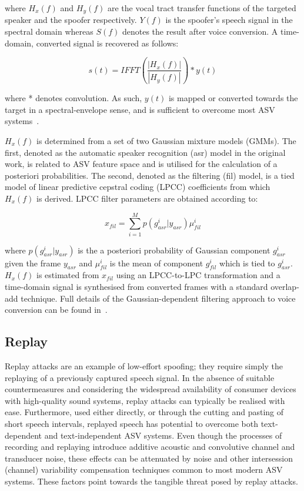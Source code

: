 \noindent where $H_{x}(f)$ and $H_{y}(f)$ are the vocal tract transfer functions of the targeted speaker and the spoofer respectively.  $Y(f)$ is the spoofer's speech signal in the spectral domain whereas $S(f)$ denotes the result after voice conversion. A time-domain, converted  signal is recovered as follows:

\begin{equation}
s(t) = IFFT(\frac{\left|H_{x}(f)\right|}{\left|H_{y}(f)\right|})*y(t)
\label{eq:conversioneq_t}
\end{equation}

\noindent where * denotes convolution. As such, $y(t)$ is mapped or converted towards the target in a spectral-envelope sense, and is sufficient to overcome most ASV systems~\cite{Matrouf2005, Bonastre2006}.

$H_x(f)$ is determined from a set of two Gaussian mixture models (GMMs).  The first, denoted as the automatic speaker recognition (asr) model in the original work, is related to ASV feature space and is utilised for the calculation of a posteriori probabilities.  The second, denoted as the filtering (fil) model, is a tied model of linear predictive cepstral coding (LPCC) coefficients from which $H_x(f)$ is derived.  LPCC filter parameters are obtained according to:

\begin{equation}
x_{fil} = \sum\limits_{i=1}^{M}p(g_{asr}^{i}|y_{asr}) \mu_{fil}^{i}
\label{eq:EMit}
\end{equation}

\noindent where $p(g_{asr}^{i}|y_{asr})$ is the a posteriori probability of Gaussian component $g_{asr}^{i}$ given the frame $y_{asr}$ and $\mu_{fil}^{i}$ is the mean of component $g_{fil}^{i}$ which is tied to $g_{asr}^{i}$.  $H_{x}(f)$ is estimated from $x_{fil}$ using an LPCC-to-LPC transformation and a time-domain signal is synthesised from converted frames with a standard overlap-add technique.  Full details of the Gaussian-dependent filtering approach to voice conversion can be found in~\cite{Matrouf2005, Bonastre2006, Bonastre2007}.


\subsection{Replay}
\label{ssec:replay}


Replay attacks are an example of low-effort spoofing; they require simply the replaying of a previously captured speech signal.  
In the absence of suitable countermeasures and considering the widespread availability of consumer devices with high-quality sound systems, replay attacks can typically be realised with ease.  Furthermore, used either directly, or through the cutting and pasting of short speech intervals, replayed speech has potential to overcome both text-dependent and text-independent ASV systems.  Even though the processes of recording and replaying introduce additive acoustic and convolutive channel and transducer noise, these effects can be attenuated by noise and other intersession (channel) variability compensation techniques common to most modern ASV systems.  These factors point towards the tangible threat posed by replay attacks.

